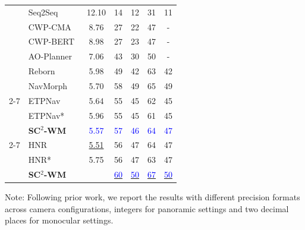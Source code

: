 \documentclass{article}
\theoremstyle{plain}
\theoremstyle{definition}
\theoremstyle{remark}
\begin{document}
\begin{table}[t!]
{\begin{threeparttable}
\begin{tabular}{@{}c|l|ccccc@{}}
				& Seq2Seq~\cite{anderson2018vision} & 12.10 & 14 & 12 & 31 & 11 \\
				& CWP-CMA~\cite{Hong2022BridgingTG} & 8.76 & 27 & 22 & 47 & - \\
				& CWP-BERT~\cite{Hong2022BridgingTG} & 8.98 & 27 & 23 & 47 & - \\
				& AO-Planner~\cite{chen2024affordances} & 7.06 & 43 & 30 & 50 & - \\
				& Reborn~\cite{an20221st} & 5.98 & 49 & 42 & {63} & 42\\
                & NavMorph~\cite{Yao2025navmorph} & 5.70 & 58 & 49 & 65 & 49 \\
                \cmidrule(l){2-7}
                & ETPNav~\cite{an2024etpnav} & {5.64} & 55 & 45 & 62& 45 \\
                	& \cellcolor{gray!5}ETPNav* & \cellcolor{gray!5}5.96 & \cellcolor{gray!5}55 & \cellcolor{gray!5}45 & \cellcolor{gray!5}61 & \cellcolor{gray!5}45 \\
            & \cellcolor{gray!15}\textbf{SC$^2$-WM}    & \cellcolor{gray!15}\textcolor{blue}{5.57}    & \cellcolor{gray!15}\textcolor{blue}{57}   & \cellcolor{gray!15}\textcolor{blue}{46}     & \cellcolor{gray!15}\textcolor{blue}{64}     & \cellcolor{gray!15}\textcolor{blue}{47}  \\
                \cmidrule(l){2-7}
                & HNR~\cite{wang2024lookahead} & \underline{5.51} & 56 & 47 & 64 & 47 \\
                & \cellcolor{gray!5}HNR* & \cellcolor{gray!5}5.75 & \cellcolor{gray!5}56 & \cellcolor{gray!5}47 & \cellcolor{gray!5}63 & \cellcolor{gray!5}47 \\
				& \cellcolor{gray!15}\textbf{SC$^2$-WM} & \cellcolor{gray!15}{5.72}  & \cellcolor{gray!15}\underline{\textcolor{blue}{60}} 	& \cellcolor{gray!15}\underline{\textcolor{blue}{50}}	& \cellcolor{gray!15}\underline{\textcolor{blue}{67}} 	& \cellcolor{gray!15}\underline{\textcolor{blue}{50}}   \\
				\bottomrule
			\end{tabular}
				\begin{tablenotes}    
                \item Note: Following prior work, we report the results with different precision formats across camera configurations, integers for panoramic settings and two decimal places for monocular settings. 
			\end{tablenotes}           
			\end{threeparttable} 	
	}
\end{table}
\end{document}

